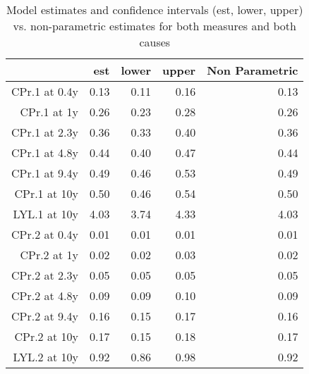 \documentclass[a4paper,11pt]{article}\usepackage[]{graphicx}\usepackage[]{color}
\begin{document}
\begin{table}[ht]
\centering
\begin{tabular}{rrrrr}
  \hline
 & est & lower & upper & Non 
 Parametric \\ 
  \hline
CPr.1 at 0.4y & 0.13 & 0.11 & 0.16 & 0.13 \\ 
  CPr.1 at 1y & 0.26 & 0.23 & 0.28 & 0.26 \\ 
  CPr.1 at 2.3y & 0.36 & 0.33 & 0.40 & 0.36 \\ 
  CPr.1 at 4.8y & 0.44 & 0.40 & 0.47 & 0.44 \\ 
  CPr.1 at 9.4y & 0.49 & 0.46 & 0.53 & 0.49 \\ 
  CPr.1 at 10y & 0.50 & 0.46 & 0.54 & 0.50 \\ 
  LYL.1 at 10y & 4.03 & 3.74 & 4.33 & 4.03 \\ 
  CPr.2 at 0.4y & 0.01 & 0.01 & 0.01 & 0.01 \\ 
  CPr.2 at 1y & 0.02 & 0.02 & 0.03 & 0.02 \\ 
  CPr.2 at 2.3y & 0.05 & 0.05 & 0.05 & 0.05 \\ 
  CPr.2 at 4.8y & 0.09 & 0.09 & 0.10 & 0.09 \\ 
  CPr.2 at 9.4y & 0.16 & 0.15 & 0.17 & 0.16 \\ 
  CPr.2 at 10y & 0.17 & 0.15 & 0.18 & 0.17 \\ 
  LYL.2 at 10y & 0.92 & 0.86 & 0.98 & 0.92 \\ 
   \hline
\end{tabular}
\caption{Model estimates and confidence intervals (est, lower, upper) vs. non-parametric estimates for both measures and both causes} 
\end{table}
\end{document}
